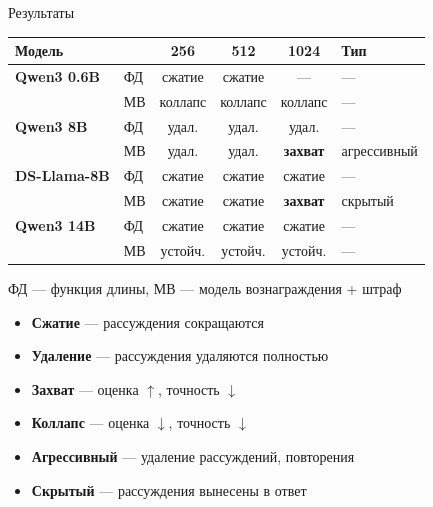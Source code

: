 \begin{frame}{Результаты}
    \begin{table}[h]
    \centering
    \scriptsize
    \begin{tabular}{ll|ccc|p{2.5cm}}
    \hline
    \textbf{Модель} & & \textbf{256} & \textbf{512} & \textbf{1024} & \textbf{Тип} \\
    \hline
    \textbf{Qwen3 0.6B} & ФД & сжатие & сжатие & --- & --- \\
                         & МВ & коллапс & коллапс & коллапс & --- \\
    \hline
    \textbf{Qwen3 8B}   & ФД & удал. & удал. & удал. & --- \\
                         & МВ & удал. & удал. & \textbf{захват} & агрессивный \\
    \hline
    \textbf{DS-Llama-8B} & ФД & сжатие & сжатие & сжатие & --- \\
                         & МВ & сжатие & сжатие & \textbf{захват} & скрытый \\
    \hline
    \textbf{Qwen3 14B}  & ФД & сжатие & сжатие & сжатие & --- \\
                         & МВ & устойч. & устойч. & устойч. & --- \\
    \hline
    \end{tabular}
    \end{table}
    
    \vspace{0.1cm}
    \small
    ФД --- функция длины, МВ --- модель вознаграждения + штраф
    \vspace{0.1cm}
    \begin{itemize}
        \item \textbf{Сжатие} --- рассуждения сокращаются
        \item \textbf{Удаление} --- рассуждения удаляются полностью
        \item \textbf{Захват} --- оценка $\uparrow$, точность $\downarrow$
        \item \textbf{Коллапс} --- оценка $\downarrow$, точность $\downarrow$
        \item \textbf{Агрессивный} --- удаление рассуждений, повторения
        \item \textbf{Скрытый} --- рассуждения вынесены в ответ
    \end{itemize}
\end{frame}

